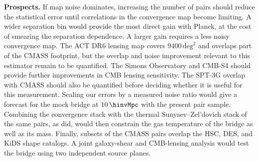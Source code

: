 \textbf{Prospects.} If map noise dominates, increasing the number of pairs
should reduce the statistical error until correlations in the convergence
map become limiting. A wider separation bin would provide the most direct
gain with Planck, at the cost of smearing the separation dependence. A larger
gain requires a less noisy convergence map. The ACT DR6 lensing map covers
$9400\,\mathrm{deg}^{2}$ and overlaps part of the CMASS footprint, but the
overlap and noise improvement relevant to this estimator remain to be
quantified. %
The Simons Observatory and CMB-S4 should provide further improvements in CMB
lensing sensitivity. %
The SPT-3G overlap with CMASS should also be quantified before deciding
whether it is useful for this measurement. Scaling our errors by a measured
noise ratio would give a forecast for the mock bridge at $10\,\hinvMpc$ with
the present pair sample. %
Combining the convergence stack with the
thermal Sunyaev--Zel'dovich stack of the same pairs, as \citet{deGraaff2019}
did, would then constrain the gas temperature of the bridge as well as its
mass. Finally, subsets of the CMASS pairs overlap the HSC, DES, and KiDS shape
catalogs. A joint galaxy-shear and CMB-lensing analysis would test the bridge
using two independent source planes. %
